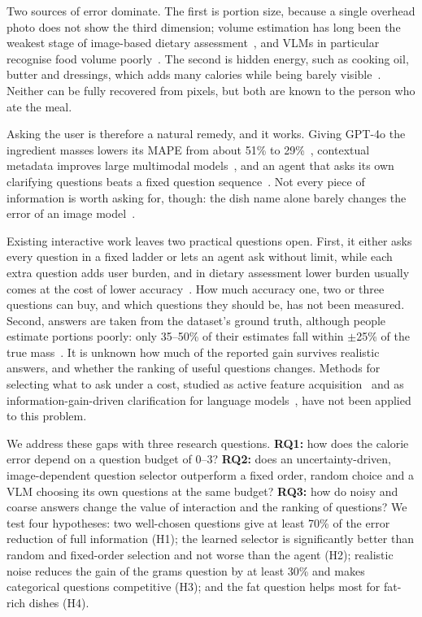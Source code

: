 \documentclass[twocolumn]{svjour3}
\begin{document}
Two sources of error dominate. The first is portion size, because a single overhead photo does not show
the third dimension; volume estimation has long been the weakest stage of image-based dietary
assessment~\cite{lo2020review,vinod2026portion}, and VLMs in particular recognise food volume
poorly~\cite{tanabe2025calorievol}. The second is hidden energy, such as cooking oil, butter and dressings,
which adds many calories while being barely visible~\cite{bhatambarekar2025thesis}. Neither can be fully
recovered from pixels, but both are known to the person who ate the meal.

Asking the user is therefore a natural remedy, and it works. Giving GPT-4o the ingredient masses lowers
its MAPE from about 51\% to 29\%~\cite{bhatambarekar2025thesis}, contextual metadata improves large
multimodal models~\cite{coburn2025lmm}, and an agent that asks its own clarifying questions beats a fixed
question sequence~\cite{bhatambarekar2026agentic}. Not every piece of information is worth asking for,
though: the dish name alone barely changes the error of an image model~\cite{narang2025multimodal}.

Existing interactive work leaves two practical questions open. First, it either asks every question in a
fixed ladder or lets an agent ask without limit, while each extra question adds user burden, and in dietary
assessment lower burden usually comes at the cost of lower accuracy~\cite{hochsmann2020review}. How much
accuracy one, two or three questions can buy, and which questions they should be, has not been measured.
Second, answers are taken from the dataset's ground truth, although people estimate portions poorly: only
35--50\% of their estimates fall within $\pm$25\% of the true mass~\cite{lucassen2021portion}. It is unknown
how much of the reported gain survives realistic answers, and whether the ranking of useful questions
changes. Methods for selecting what to ask under a cost, studied as active feature
acquisition~\cite{aronsson2025afa} and as information-gain-driven clarification for language
models~\cite{kobalczyk2025active,infogain2026clarification}, have not been applied to this problem.

We address these gaps with three research questions. \textbf{RQ1:} how does the calorie error depend on a
question budget of 0--3? \textbf{RQ2:} does an uncertainty-driven, image-dependent question selector
outperform a fixed order, random choice and a VLM choosing its own questions at the same budget?
\textbf{RQ3:} how do noisy and coarse answers change the value of interaction and the ranking of questions?
We test four hypotheses: two well-chosen questions give at least 70\% of the error reduction of full
information (H1); the learned selector is significantly better than random and fixed-order selection and
not worse than the agent (H2); realistic noise reduces the gain of the grams question by at least 30\% and
makes categorical questions competitive (H3); and the fat question helps most for fat-rich dishes (H4).
\end{document}
